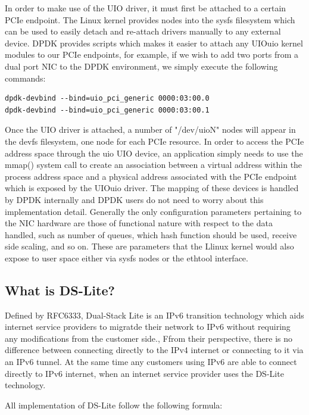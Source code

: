 \documentclass[a4paper,12p,titlepage]{article}
\begin{document}
In order to make use of the UIO driver, it must first be attached to a certain PCIe endpoint. The Linux kernel provides nodes into the sysfs filesystem which can be used to easily detach and re-attach drivers manually to any external device. DPDK provides scripts which makes it easier to attach any UIOuio kernel modules to our PCIe endpoints, for example, if we wish to add two ports from a dual port NIC to the DPDK environment, we simply execute the following commands:

\begin{lstlisting}
dpdk-devbind --bind=uio_pci_generic 0000:03:00.0
dpdk-devbind --bind=uio_pci_generic 0000:03:00.1
\end{lstlisting}

 Once the UIO driver is attached, a number of "/dev/uioN" nodes will appear in the devfs filesystem, one node for each PCIe resource. In order to access the PCIe address space through the uio UIO device, an application simply needs to use the mmap() system call to create an association between a virtual address within the process address space and a physical address associated with the PCIe endpoint which is exposed by the UIOuio driver. The mapping of these devices is handled by DPDK internally and DPDK users do not need to worry about this implementation detail. Generally the only configuration parameters pertaining to the NIC hardware are those of functional nature with respect to the data handled, such as number of queues, which hash function should be used, receive side scaling, and so on. These are parameters that the Llinux kernel would also expose to user space either via sysfs nodes or the ethtool interface.

\subsection{What is DS-Lite?}

Defined by RFC6333, Dual-Stack Lite is an IPv6 transition technology which aids internet service providers to migratde their network to IPv6 without requiring any modifications from the customer side., Ffrom their perspective, there is no difference between connecting directly to the IPv4 internet or connecting to it via an IPv6 tunnel. At the same time any customers using IPv6 are able to connect directly to IPv6 internet, when an internet service provider uses the DS-Lite technology.

All implementation of DS-Lite follow the following formula:
\end{document}
